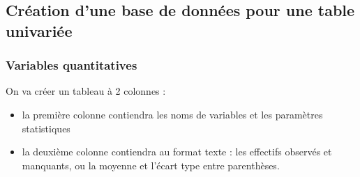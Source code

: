 \documentclass[
]{book}
\providecommand{\tightlist}{%
  \setlength{\itemsep}{0pt}\setlength{\parskip}{0pt}}
\begin{document}
\subsection{Création d'une base de données pour une table univariée}\label{cruxe9ation-dune-base-de-donnuxe9es-pour-une-table-univariuxe9e}

\subsubsection{Variables quantitatives}\label{variables-quantitatives-2}

On va créer un tableau à 2 colonnes :

\begin{itemize}
\tightlist
\item
  la première colonne contiendra les noms de variables et les paramètres statistiques
\item
  la deuxième colonne contiendra au format texte : les effectifs observés et manquants, ou la moyenne et l'écart type entre parenthèses.
\end{itemize}
\end{document}
